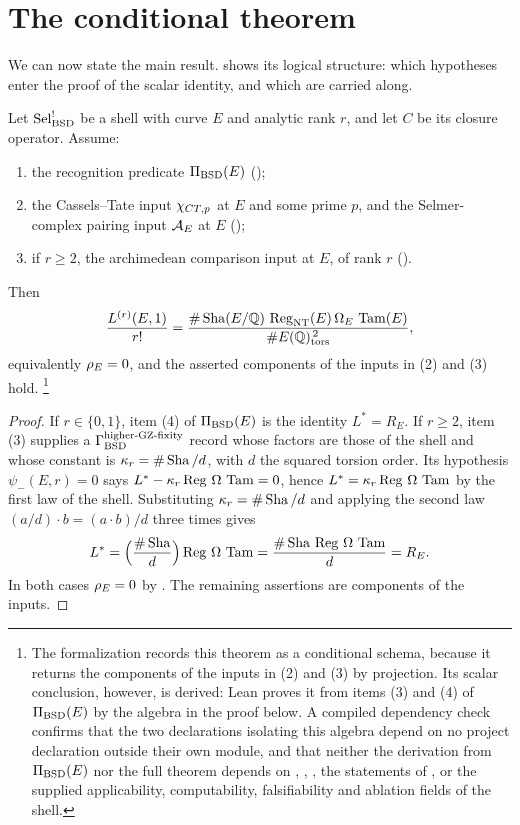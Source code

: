 \section{The conditional theorem}
\label{sec:landing}

We can now state the main result.  
shows its logical structure: which hypotheses enter the proof of the
scalar identity, and which are carried along.



\begin{theorem}\label{thm:closure:strong-bsd-conditional}
Let $\mathrm{Sel}^{!}_{\mathrm{BSD}}$ be a shell with curve $E$ and analytic rank $r$, and let
$C$ be its closure operator.  Assume:
\begin{enumerate}
\item the recognition predicate $\Pi_{\mathrm{BSD}}(E)$
  ();
\item the Cassels--Tate input $\chi_{CT,p}$ at $E$ and some prime $p$, and the
  Selmer-complex pairing input $\mathcal{A}_E$ at $E$
  ();
\item if $r\ge2$, the archimedean comparison input at $E$, of rank $r$
  ().
\end{enumerate}
Then
\[
  \frac{L^{(r)}(E,1)}{r!}
  =
  \frac{\#\operatorname{Sha}(E/\mathbb{Q})\,\operatorname{Reg}_{\mathrm{NT}}(E)\,\Omega_E\,\operatorname{Tam}(E)}
       {\#E(\mathbb{Q})_{\operatorname{tors}}^{\,2}},
\]
equivalently $\rho_E=0$, and the asserted components of the inputs in
(2) and (3) hold.%
\footnote{The formalization records this theorem as a conditional
schema, because it returns the components of the inputs in (2) and (3)
by projection.  Its scalar conclusion, however, is derived: Lean proves
it from items (3) and (4) of $\Pi_{\mathrm{BSD}}(E)$ by the algebra in the proof
below.  A compiled dependency check confirms that the two declarations
isolating this algebra depend on no project declaration outside their
own module,
and that neither the derivation from $\Pi_{\mathrm{BSD}}(E)$ nor the full theorem
depends on ,
, ,
the statements of , or the supplied applicability,
computability, falsifiability and ablation fields of the shell.}
\end{theorem}

\begin{proof}
If $r\in\{0,1\}$, item (4) of $\Pi_{\mathrm{BSD}}(E)$ is the identity $L^*=R_E$.
If $r\ge2$, item (3) supplies a $\Gamma_{\mathrm{BSD}}^{\mathrm{higher\text{-}GZ\text{-}fixity}}$ record whose factors are those
of the shell and whose constant is $\kappa_r=\#\operatorname{Sha}/d$, with $d$ the squared
torsion order.  Its hypothesis $\psi_-(E,r)=0$ says
$L^*-\kappa_r\operatorname{Reg}\,\Omega\,\operatorname{Tam}=0$, hence $L^*=\kappa_r\operatorname{Reg}\,\Omega\,\operatorname{Tam}$ by the
first law of the shell.  Substituting $\kappa_r=\#\operatorname{Sha}/d$ and applying the
second law $(a/d)\cdot b=(a\cdot b)/d$ three times gives
\[
  L^*
  =\Bigl(\frac{\#\operatorname{Sha}}{d}\Bigr)\operatorname{Reg}\,\Omega\,\operatorname{Tam}
  =\frac{\#\operatorname{Sha}\,\operatorname{Reg}\,\Omega\,\operatorname{Tam}}{d}
  =R_E .
\]
In both cases $\rho_E=0$ by .  The
remaining assertions are components of the inputs.
\end{proof}

